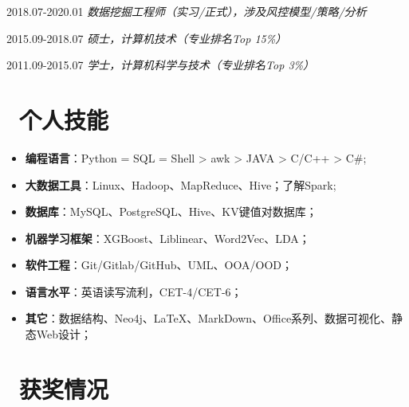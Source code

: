 \documentclass{resume}
\begin{document}
         {2018.07-2020.01}
   \faUserMd   \textit{   数据挖掘工程师（实习/正式），涉及风控模型/策略/分析 }

                              {2015.09-2018.07}
   \faGraduationCap   \textit{  硕士，计算机技术（专业排名Top 15\%） }

                        {2011.09-2015.07}
   \faGraduationCap   \textit{  学士，计算机科学与技术（专业排名Top 3\%） }

\medskip










\section{   \faCogs    \  个人技能}

\begin{itemize}  [parsep=0.5ex]

   \item   \textbf{编程语言}：Python = SQL = Shell > awk > JAVA > C/C++ > C\#;
   \item    \textbf{大数据工具}：Linux、Hadoop、MapReduce、Hive；了解Spark;
   \item    \textbf{数据库}：MySQL、PostgreSQL、Hive、KV键值对数据库；
   \item    \textbf{机器学习框架}：XGBoost、Liblinear、Word2Vec、LDA；
   \item    \textbf{软件工程}：Git/Gitlab/GitHub、UML、OOA/OOD；
   \item    \textbf{语言水平}：英语读写流利，CET-4/CET-6；
   \item    \textbf{其它}：数据结构、Neo4j、LaTeX、MarkDown、Office系列、数据可视化、静态Web设计；
 
\end{itemize}

\medskip










\section{   \faTrophy   \ 获奖情况}
\end{document}

